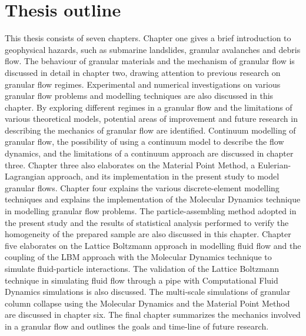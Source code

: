 \section{Thesis outline}
This thesis consists of seven chapters. Chapter one gives a brief introduction 
to geophysical hazards, such as submarine landslides, granular avalanches and 
debris flow. The behaviour of granular materials and the mechanism of granular 
flow is discussed in detail in chapter two, drawing attention to previous 
research on granular flow regimes. Experimental and numerical investigations on 
various granular flow problems and modelling techniques are also discussed in 
this chapter. By exploring different regimes in a granular flow and the 
limitations of various theoretical models, potential areas of improvement and 
future research in describing the mechanics of granular flow are identified. 
Continuum modelling of granular flow, the possibility of using a continuum 
model to describe the flow dynamics, and the limitations of a continuum 
approach are discussed in chapter three. Chapter three also elaborates on the 
Material Point Method, a Eulerian-Lagrangian approach, and its implementation 
in the present study to model granular flows. Chapter four explains the various 
discrete-element modelling techniques and explains the implementation of the 
Molecular Dynamics technique in modelling granular flow problems. The 
particle-assembling method adopted in the present study and the results of 
statistical analysis performed to verify the homogeneity of the prepared sample 
are also discussed in this chapter. Chapter five elaborates on the Lattice 
Boltzmann approach in modelling fluid flow and the coupling of the LBM approach 
with the Molecular Dynamics technique to simulate fluid-particle interactions. 
The validation of the Lattice Boltzmann technique in simulating fluid flow 
through a pipe with Computational Fluid Dynamics simulations is also discussed. 
The multi-scale simulations of granular column collapse using the Molecular 
Dynamics and the Material Point Method are discussed in chapter six. The final 
chapter summarizes the mechanics involved in a granular flow and outlines the 
goals and time-line of future research.